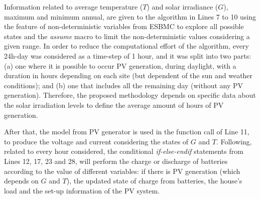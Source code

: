 \documentclass[journal]{IEEEtran}
\begin{document}
Information related to average temperature ($T$) and solar irradiance ($G$), maximum and minimum annual, are given to the algorithm in Lines 7 to 10 using the feature of non-deterministic variables from ESBMC to explore all possible states and the \textit{assume} macro to limit the non-deterministic values considering a given range. 
In order to reduce the computational effort of the algorithm,
every 24h-day was considered as a time-step of 1 hour, and it was split into two parts: (a) one where it is possible to occur PV generation, during daylight, with a duration in hours depending on each site (but dependent of the sun and weather conditions); and (b) one that includes all the remaining day (without any PV generation). Therefore, the proposed methodology depends on specific data about the solar irradiation levels to define the average amount of hours of PV generation.

After that, the model from PV generator is used in the function call of Line 11, to produce the voltage and current considering the states of $G$ and $T$. Following, related to every hour considered, the conditional \textit{if-else-endif} statements from Lines 12, 17, 23 and 28, will perform the charge or discharge of batteries according to the value of different variables: if there is PV generation (which depends on $G$ and $T$), the updated state of charge from batteries, the house's load and the set-up information of the PV system.
\end{document}
